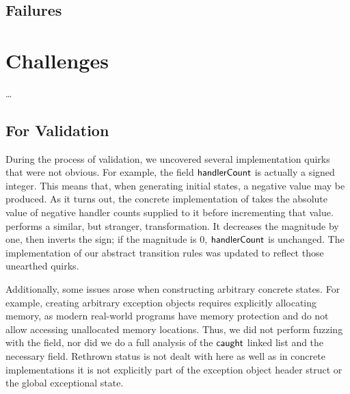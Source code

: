 \subsection{Failures}

\section{Challenges}
\todo\dots

\subsection{For Validation}
During the process of validation, we uncovered several implementation quirks that were not obvious.
For example, the field $\mathsf{handlerCount}$ is actually a signed integer.
This means that, when generating initial states, a negative value may be produced.
As it turns out, the concrete implementation of  takes the absolute value of negative handler counts supplied to it before incrementing that value.
 performs a similar, but stranger, transformation.
It decreases the magnitude by one, then inverts the sign; if the magnitude is 0, $\mathsf{handlerCount}$ is unchanged.
The implementation of our abstract transition rules was updated to reflect those unearthed quirks.

Additionally, some issues arose when constructing arbitrary concrete states.
For example, creating arbitrary exception objects requires explicitly allocating memory, as modern real-world programs have memory protection and do not allow accessing unallocated memory locations.
Thus, we did not perform fuzzing with the  field, nor did we do a full analysis of the $\mathsf{caught}$ linked list and the necessary  field.
Rethrown status is not dealt with here as well as in concrete implementations it is not explicitly part of the exception object header struct or the global exceptional state.

